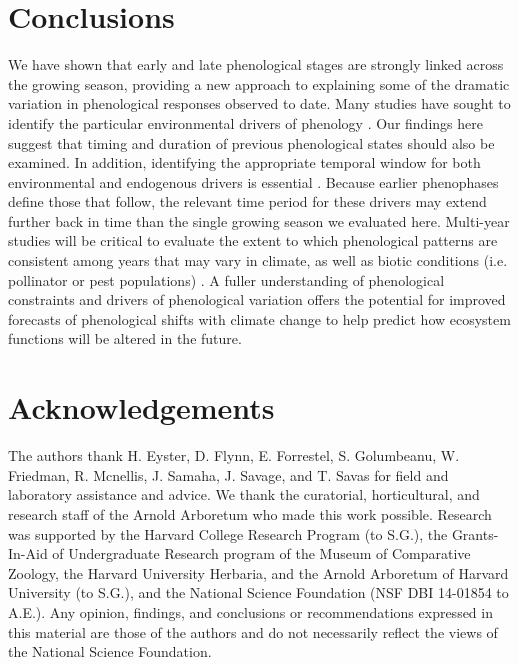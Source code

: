 \documentclass{article}
\begin{document}
\section* {Conclusions}
We have shown that early and late phenological stages are strongly linked across the growing season, providing a new approach to explaining some of the dramatic variation in phenological responses observed to date.  Many studies have sought to identify the particular environmental drivers of phenology \citep [e.g.][]{morin2010,schwartz2013}. Our findings here suggest that timing and duration of previous phenological states should also be examined. In addition, identifying the appropriate temporal window for both environmental and endogenous drivers is essential \citep{teller2016}. Because earlier phenophases define those that follow, the relevant time period for these drivers may extend further back in time than the single growing season we evaluated here. Multi-year studies will be critical to evaluate the extent to which phenological patterns are consistent among years that may vary in climate, as well as biotic conditions (i.e. pollinator or pest populations)  \citep{lechowicz1995}. %
A fuller understanding of phenological constraints and drivers of phenological variation offers the potential for improved forecasts of phenological shifts  with climate change to help predict how ecosystem functions will be altered in the future. 

\section*{Acknowledgements} %
The authors thank H. Eyster, D. Flynn, E. Forrestel, S. Golumbeanu, W. Friedman, R. Mcnellis, J. Samaha, J. Savage, and T. Savas for field and laboratory assistance and advice. We thank the curatorial, horticultural, and research staff of the Arnold Arboretum who made this work possible. Research was supported by the Harvard College Research Program (to S.G.), the Grants-In-Aid of Undergraduate Research program of the Museum of Comparative Zoology, the Harvard University Herbaria, and the Arnold Arboretum of Harvard University (to S.G.), and the National Science Foundation (NSF DBI 14-01854 to A.E.). Any opinion, findings, and conclusions or recommendations expressed in this material are those of the authors and do not necessarily reflect the views of the National Science Foundation.
\end{document}
